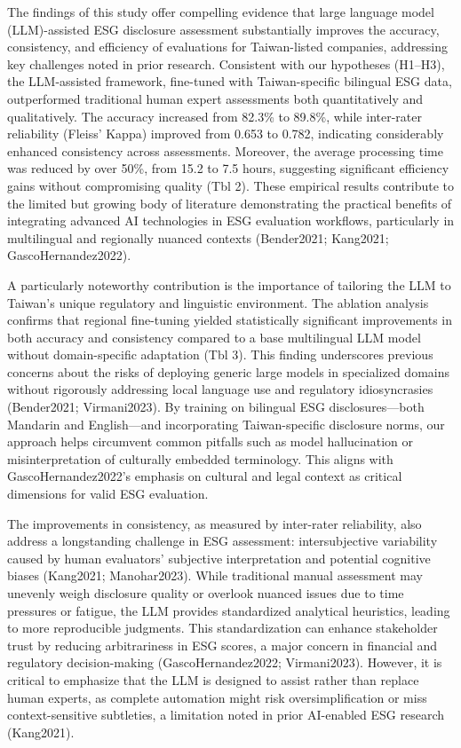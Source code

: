 \documentclass[
  12pt,
]{article}
\begin{document}
The findings of this study offer compelling evidence that large language
model (LLM)-assisted ESG disclosure assessment substantially improves
the accuracy, consistency, and efficiency of evaluations for
Taiwan-listed companies, addressing key challenges noted in prior
research. Consistent with our hypotheses (H1--H3), the LLM-assisted
framework, fine-tuned with Taiwan-specific bilingual ESG data,
outperformed traditional human expert assessments both quantitatively
and qualitatively. The accuracy increased from 82.3\% to 89.8\%, while
inter-rater reliability (Fleiss' Kappa) improved from 0.653 to 0.782,
indicating considerably enhanced consistency across assessments.
Moreover, the average processing time was reduced by over 50\%, from
15.2 to 7.5 hours, suggesting significant efficiency gains without
compromising quality (Tbl 2). These empirical results contribute to the
limited but growing body of literature demonstrating the practical
benefits of integrating advanced AI technologies in ESG evaluation
workflows, particularly in multilingual and regionally nuanced contexts
(Bender2021; Kang2021; GascoHernandez2022).

A particularly noteworthy contribution is the importance of tailoring
the LLM to Taiwan's unique regulatory and linguistic environment. The
ablation analysis confirms that regional fine-tuning yielded
statistically significant improvements in both accuracy and consistency
compared to a base multilingual LLM model without domain-specific
adaptation (Tbl 3). This finding underscores previous concerns about the
risks of deploying generic large models in specialized domains without
rigorously addressing local language use and regulatory idiosyncrasies
(Bender2021; Virmani2023). By training on bilingual ESG
disclosures---both Mandarin and English---and incorporating
Taiwan-specific disclosure norms, our approach helps circumvent common
pitfalls such as model hallucination or misinterpretation of culturally
embedded terminology. This aligns with GascoHernandez2022's emphasis on
cultural and legal context as critical dimensions for valid ESG
evaluation.

The improvements in consistency, as measured by inter-rater reliability,
also address a longstanding challenge in ESG assessment: intersubjective
variability caused by human evaluators' subjective interpretation and
potential cognitive biases (Kang2021; Manohar2023). While traditional
manual assessment may unevenly weigh disclosure quality or overlook
nuanced issues due to time pressures or fatigue, the LLM provides
standardized analytical heuristics, leading to more reproducible
judgments. This standardization can enhance stakeholder trust by
reducing arbitrariness in ESG scores, a major concern in financial and
regulatory decision-making (GascoHernandez2022; Virmani2023). However,
it is critical to emphasize that the LLM is designed to assist rather
than replace human experts, as complete automation might risk
oversimplification or miss context-sensitive subtleties, a limitation
noted in prior AI-enabled ESG research (Kang2021).
\end{document}
